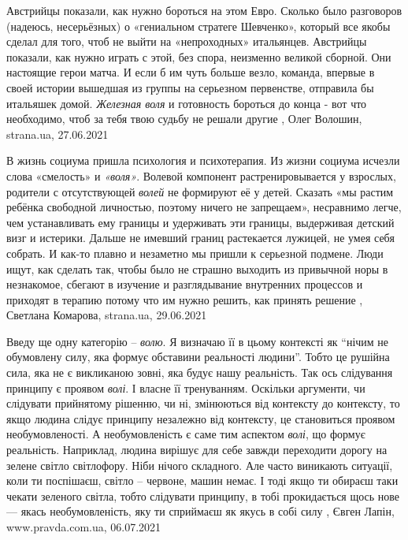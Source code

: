 Австрийцы показали, как нужно бороться на этом Евро.  Сколько было разговоров
(надеюсь, несерьёзных) о «гениальном стратеге Шевченко», который все якобы
сделал для того, чтоб не выйти на «непроходных» итальянцев. Австрийцы показали,
как нужно играть с этой, без спора, неизменно великой сборной.  Они настоящие
герои матча. И если б им чуть больше везло, команда, впервые в своей истории
вышедшая из группы на серьезном первенстве, отправила бы итальяшек домой.
\emph{Железная воля} и готовность бороться до конца - вот что необходимо, чтоб за тебя
твою судьбу не решали другие
, 
Олег Волошин, strana.ua, 27.06.2021

В жизнь социума пришла психология и психотерапия. Из жизни социума исчезли
слова «смелость» и \emph{«воля»}. Волевой компонент растренировывается у взрослых,
родители с отсутствующей \emph{волей} не формируют её у детей. Сказать «мы растим
ребёнка свободной личностью, поэтому ничего не запрещаем», несравнимо легче,
чем устанавливать ему границы и удерживать эти границы, выдерживая детский визг
и истерики. Дальше не имевший границ растекается лужицей, не умея себя собрать.
И как-то плавно и незаметно мы пришли к серьезной подмене. Люди ищут, как
сделать так, чтобы было не страшно выходить из привычной норы в незнакомое,
сбегают в изучение и разглядывание внутренних процессов и приходят в терапию
потому что им нужно решить, как принять решение
, 
Светлана Комарова, strana.ua, 29.06.2021


Введу ще одну категорію – \emph{волю}. Я визначаю її в цьому контексті як \enquote{нічим не
обумовлену силу, яка формує обставини реальності людини}. Тобто це рушійна
сила, яка не є викликаною зовні, яка будує нашу реальність.  Так ось слідування
принципу є проявом \emph{волі}. І власне її тренуванням.  Оскільки аргументи, чи
слідувати прийнятому рішенню, чи ні, змінюються від контексту до контексту, то
якщо людина слідує принципу незалежно від контексту, це становиться проявом
необумовленості. А необумовленість є саме тим аспектом \emph{волі}, що формує
реальність.  Наприклад, людина вирішує для себе завжди переходити дорогу на
зелене світло світлофору. Ніби нічого складного. Але часто виникають ситуації,
коли ти поспішаєш, світло – червоне, машин немає. І тоді якщо ти обираєш таки
чекати зеленого світла, тобто слідувати принципу, в тобі прокидається щось нове
— якась необумовленість, яку ти сприймаєш як якусь в собі силу
, 
Євген Лапін, www.pravda.com.ua, 06.07.2021
